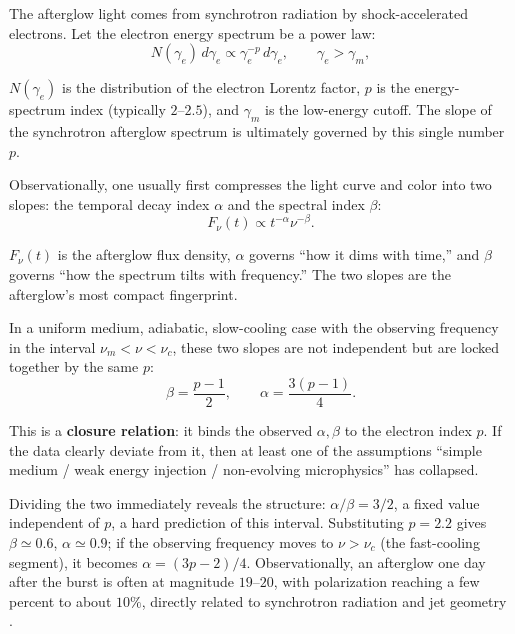 The afterglow light comes from synchrotron radiation by shock-accelerated electrons. Let the electron energy spectrum be a power law:
\begin{equation}
  N(\gamma_e)\,d\gamma_e \propto \gamma_e^{-p}\,d\gamma_e,
  \qquad \gamma_e>\gamma_m,
  \label{eq:e20-electron-powerlaw}
\end{equation}
\begin{formulaexplain}
\(N(\gamma_e)\) is the distribution of the electron Lorentz factor, \(p\) is the energy-spectrum index (typically \(2\text{--}2.5\)), and \(\gamma_m\) is the low-energy cutoff. The slope of the synchrotron afterglow spectrum is ultimately governed by this single number \(p\).
\end{formulaexplain}
Observationally, one usually first compresses the light curve and color into two slopes: the temporal decay index \(\alpha\) and the spectral index \(\beta\):
\begin{equation}
  F_\nu(t)\propto t^{-\alpha}\nu^{-\beta}.
  \label{eq:e20-afterglow-powerlaw}
\end{equation}
\begin{formulaexplain}
\(F_\nu(t)\) is the afterglow flux density, \(\alpha\) governs ``how it dims with time,'' and \(\beta\) governs ``how the spectrum tilts with frequency.'' The two slopes are the afterglow's most compact fingerprint.
\end{formulaexplain}
In a uniform medium, adiabatic, slow-cooling case with the observing frequency in the interval \(\nu_m<\nu<\nu_c\), these two slopes are not independent but are locked together by the same \(p\):
\begin{equation}
  \beta=\frac{p-1}{2},
  \qquad
  \alpha=\frac{3(p-1)}{4}.
  \label{eq:e20-closure-relation}
\end{equation}
\begin{formulaexplain}
This is a \textbf{closure relation}: it binds the observed \(\alpha,\beta\) to the electron index \(p\). If the data clearly deviate from it, then at least one of the assumptions ``simple medium / weak energy injection / non-evolving microphysics'' has collapsed.
\end{formulaexplain}
Dividing the two immediately reveals the structure: \(\alpha/\beta=3/2\), a fixed value independent of \(p\), a hard prediction of this interval. Substituting \(p=2.2\) gives \(\beta\simeq0.6\), \(\alpha\simeq0.9\); if the observing frequency moves to \(\nu>\nu_c\) (the fast-cooling segment), it becomes \(\alpha=(3p-2)/4\). Observationally, an afterglow one day after the burst is often at magnitude \(19\text{--}20\), with polarization reaching a few percent to about \(10\%\), directly related to synchrotron radiation and jet geometry \citep{2004RvMP...76.1143P,2006ARA&A..44..507W}.

